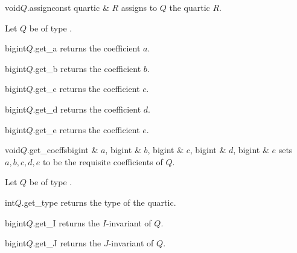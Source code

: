 \begin{fcode}{void}{$Q$.assign}{const quartic & $R$}
  assigns to $Q$ the quartic $R$. 
\end{fcode}



\ACCS

Let $Q$ be of type .

\begin{cfcode}{bigint}{$Q$.get_a}{}
  returns the coefficient $a$.
\end{cfcode}

\begin{cfcode}{bigint}{$Q$.get_b}{}
  returns the coefficient  $b$.
\end{cfcode}

\begin{cfcode}{bigint}{$Q$.get_c}{}
  returns the coefficient  $c$.
\end{cfcode}

\begin{cfcode}{bigint}{$Q$.get_d}{}
  returns the coefficient  $d$.
\end{cfcode}

\begin{cfcode}{bigint}{$Q$.get_e}{}
  returns the coefficient  $e$.
\end{cfcode}

\begin{cfcode}{void}{$Q$.get_coeffs}{bigint & $a$, bigint & $b$, bigint & $c$, bigint & $d$, bigint & $e$}
  sets $a,b,c,d,e$ to be the requisite coefficients of $Q$.
\end{cfcode}



\HIGH

Let $Q$ be of type .

\begin{cfcode}{int}{$Q$.get_type}{}
  returns the type of the quartic.
\end{cfcode}

\begin{cfcode}{bigint}{$Q$.get_I}{}
  returns the $I$-invariant of $Q$.
\end{cfcode}

\begin{cfcode}{bigint}{$Q$.get_J}{}
  returns the $J$-invariant of $Q$.
\end{cfcode}

